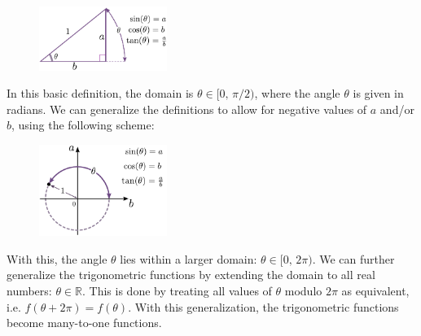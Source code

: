 \documentclass[10pt,a4paper]{article}
\begin{document}
\begin{figure}[h]
  \centering\includegraphics[width=0.37\textwidth]{trigonometry}
\end{figure}

In this basic definition, the domain is $\theta \in [0, \,\pi/2)$,
where the angle $\theta$ is given in radians. We can generalize the
definitions to allow for negative values of $a$ and/or $b$, using
the following scheme:

\begin{figure}[h]
  \centering\includegraphics[width=0.37\textwidth]{trigonometry2}
\end{figure}

With this, the angle $\theta$ lies within a larger domain: $\theta \in
[0,\,2\pi)$. We can further generalize the trigonometric functions by
extending the domain to all real numbers: $\theta \in
\mathbb{R}$. This is done by treating all values of $\theta$ modulo
$2\pi$ as equivalent, i.e.  $f(\theta + 2\pi) = f(\theta)$. With this
generalization, the trigonometric functions become many-to-one
functions.
\end{document}
